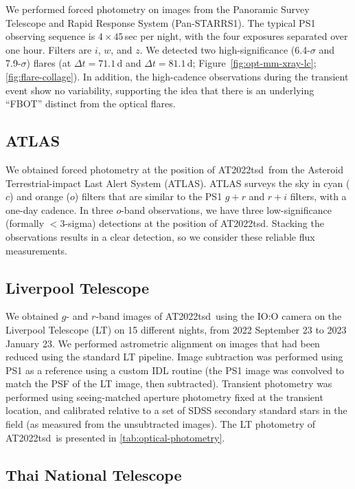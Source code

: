\documentclass{nature_plusfigure}
\newcommand{\at}{AT2022tsd}
\begin{document}
\begin{methods}
We performed forced photometry on images from the Panoramic Survey Telescope and Rapid Response System (Pan-STARRS1\cite{Tonry2012,Chambers2016}).
The typical PS1 observing sequence is $4\times45$\,sec per night, with the
four exposures separated over one hour. Filters are $i$, $w$, and $z$\cite{Tonry2012}.
We detected two high-significance (6.4-$\sigma$ and 7.9-$\sigma$) flares (at $\Delta t=71.1$\,d and $\Delta t=81.1\,$d; Figure~\ref{fig:opt-mm-xray-lc}; \ref{fig:flare-collage}).
In addition, the high-cadence observations during the transient event show no variability, supporting the idea that there is an underlying ``FBOT'' distinct from the optical flares.

\subsection{ATLAS}
\label{sec:atlas}

We obtained forced photometry at the position of \at\ from the Asteroid Terrestrial-impact Last Alert System (ATLAS\cite{Tonry2018,Smith2020,Shingles2021}).
ATLAS surveys the sky in cyan ($c$) and orange ($o$) filters that are similar to the PS1 $g+r$ and $r+i$ filters,
with a one-day cadence.
In three $o$-band observations, we have three low-significance (formally $<3$-sigma) detections at the position of \at.
Stacking the observations results in a clear detection, so we consider these reliable flux measurements.

\subsection{Liverpool Telescope}
\label{Methods: LT}

We obtained $g$- and $r$-band images of \at\ using the IO:O camera on the Liverpool Telescope\cite{Steele2004} (LT) on 15 different nights, from 2022 September 23 to 2023 January 23. We performed astrometric alignment on images that had been reduced using the standard LT pipeline.  Image subtraction was performed using PS1 as a reference using a custom IDL routine (the PS1 image was convolved to match the PSF of the LT image, then subtracted).  Transient photometry was performed using seeing-matched aperture photometry fixed at the transient location, and calibrated relative to a set of SDSS secondary standard stars in the field (as measured from the unsubtracted images). The LT photometry of \at\ is presented in \ref{tab:optical-photometry}.

\subsection{Thai National Telescope}
\label{sec:ultraspec}


\end{methods}
\end{document}
